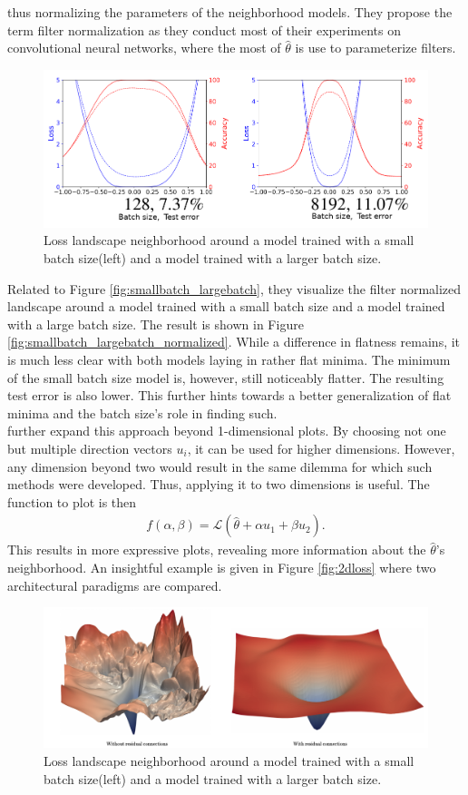 \documentclass[a4paper]{scrartcl}
\begin{document}
thus normalizing the parameters of the neighborhood models. They propose the term filter normalization as they conduct most of their experiments on convolutional neural networks, where the most of $\hat{\theta}$ is use to parameterize filters.\\
\label{fig:smallbatch_largebatch_normalized}
\begin{figure}[H]
	\centering
	\includegraphics[width=.7\linewidth]{figures/batch_size_normalized.png}
	\caption{Loss landscape neighborhood around a model trained with a small batch size(left) and a model trained with a larger batch size.}
\end{figure}
Related to Figure \ref{fig:smallbatch_largebatch}, they visualize the filter normalized landscape around a model trained with a small batch size and a model trained with a large batch size. The result is shown in Figure \ref{fig:smallbatch_largebatch_normalized}. While a difference in flatness remains, it is much less clear with both models laying in rather flat minima. The minimum of the small batch size model is, however, still noticeably flatter. The resulting test error is also lower. This further hints towards a better generalization of flat minima and the batch size's role in finding such.\\
\cite{li2017visualizing} further expand this approach beyond 1-dimensional plots. By choosing not one but multiple direction vectors $u_i$, it can be used for higher dimensions. However, any dimension beyond two would result in the same dilemma for which such methods were developed. Thus, applying it to two dimensions is useful. The function to plot is then
\begin{align*}
		f(\alpha, \beta) = \mathcal{L}(\hat{\theta} + \alpha u_1 + \beta u_2).
\end{align*}
This results in more expressive plots, revealing more information about the $\hat{\theta}$'s neighborhood. An insightful example is given in Figure \ref{fig:2dloss} where two architectural paradigms are compared. 
\label{fig:2dloss}
\begin{figure}[H]
	\centering
	\includegraphics[width=\linewidth]{figures/2dloss.pdf}
	\caption{Loss landscape neighborhood around a model trained with a small batch size(left) and a model trained with a larger batch size.}
\end{figure}
\end{document}
